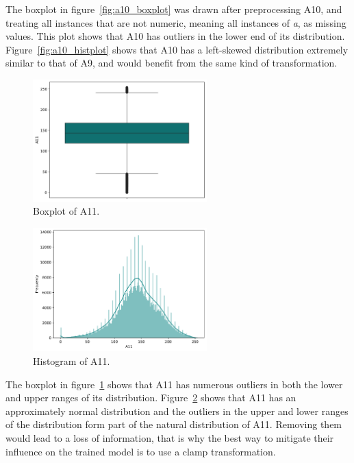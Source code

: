\documentclass[11pt]{report}
\begin{document}
The boxplot in figure~\ref{fig:a10_boxplot} was drawn after preprocessing A10, and treating all instances that are not numeric, meaning all instances of \textit{a}, as missing values. This plot shows that A10 has outliers in the lower end of its distribution. Figure~\ref{fig:a10_histplot} shows that A10 has a left-skewed distribution extremely similar to that of A9, and would benefit from the same kind of transformation.

\begin{figure}[H]
    \centering
    \includegraphics[width=0.6\textwidth]{images/A11_boxplot.pdf}
    \caption{Boxplot of A11.}
    \label{fig:a11_boxplot}
\end{figure}

\begin{figure}[H]
    \centering
    \includegraphics[width=0.6\textwidth]{images/A11_histplot.pdf}
    \caption{Histogram of A11.}
    \label{fig:a11_histplot}
\end{figure}

The boxplot in figure~\ref{fig:a11_boxplot} shows that A11 has numerous outliers in both the lower and upper ranges of its distribution. Figure~\ref{fig:a11_histplot} shows that A11 has an approximately normal distribution and the outliers in the upper and lower ranges of the distribution form part of the natural distribution of A11. Removing them would lead to a loss of information, that is why the best way to mitigate their influence on the trained model is to use a clamp transformation.
\end{document}
